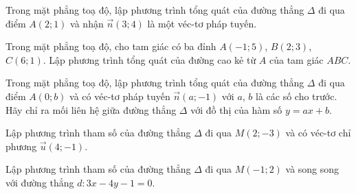 \begin{bt}%
	Trong mặt phẳng toạ độ, lập phương trình tổng quát của đường thẳng $\Delta$ đi qua điểm $A(2;1)$ và nhận $\overrightarrow{n}(3;4)$ là một véc-tơ pháp tuyến.
\end{bt}

\begin{bt}%
	Trong mặt phẳng toạ độ, cho tam giác có ba đỉnh $A(-1;5)$, $B(2;3)$, $C(6;1)$. Lập phương trình tổng quát của đường cao kẻ từ $A$ của tam giác $ABC$.
\end{bt}

\begin{bt}%
	Trong mặt phẳng toạ độ, lập phương trình tổng quát của đường thẳng $\Delta$ đi qua điểm $A(0;b)$ và có véc-tơ pháp tuyến  $\overrightarrow{n}(a;-1)$ với $a$, $b$ là các số cho trước. Hãy chỉ ra mối liên hệ giữa đường thẳng $\Delta$ với đồ thị của hàm số $y=ax+b$.
\end{bt}

\begin{bt}%
	Lập phương trình tham số của đường thẳng $\Delta$ đi qua $M(2;-3)$ và có  véc-tơ  chỉ phương $\overrightarrow{u}(4;-1)$.
\end{bt}

\begin{bt}%
	Lập phương trình tham số của đường thẳng $\Delta$ đi qua $M(-1;2)$ và song song với đường thẳng $d \colon 3x-4y-1=0$.
\end{bt}

